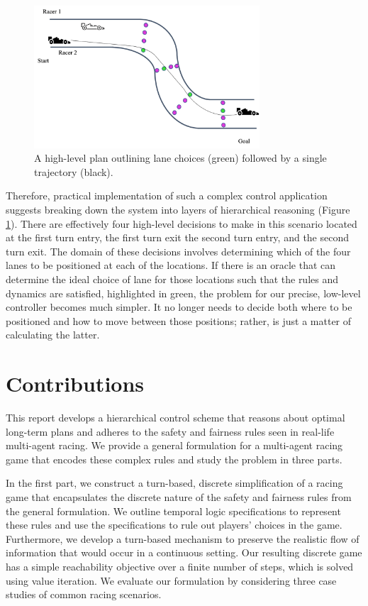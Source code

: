 \begin{figure}
\begin{center}
   \includegraphics[width=0.75\textwidth]{Figures/MotivatingExampleOracle.png}
\caption{A high-level plan outlining lane choices (green) followed by a single trajectory (black).}
\label{fig:motivating_example:oracle}
\end{center}
\end{figure}

Therefore, practical implementation of such a complex control application suggests breaking down the system into layers of hierarchical reasoning (Figure \ref{fig:motivating_example:oracle}). There are effectively four high-level decisions to make in this scenario located at the first turn entry, the first turn exit the second turn entry, and the second turn exit. The domain of these decisions involves determining which of the four lanes to be positioned at each of the locations. If there is an oracle that can determine the ideal choice of lane for those locations such that the rules and dynamics are satisfied, highlighted in green, the problem for our precise, low-level controller becomes much simpler. It no longer needs to decide both where to be positioned and how to move between those positions; rather, is just a matter of calculating the latter. 

\section{Contributions} %
This report develops a hierarchical control scheme that reasons about optimal long-term plans and adheres to the safety and fairness rules seen in real-life multi-agent racing. We provide a general formulation for a multi-agent racing game that encodes these complex rules and study the problem in three parts.

In the first part, we construct a turn-based, discrete simplification of a racing game that encapsulates the discrete nature of the safety and fairness rules from the general formulation. We outline temporal logic specifications to represent these rules and use the specifications to rule out players' choices in the game. Furthermore, we develop a turn-based mechanism to preserve the realistic flow of information that would occur in a continuous setting. Our resulting discrete game has a simple reachability objective over a finite number of steps, which is solved using value iteration. We evaluate our formulation by considering three case studies of common racing scenarios. 


